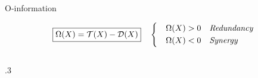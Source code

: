 \documentclass{beamer}
\renewcommand{\cite}[1]{\footnote<.->[frame]{\fullcite{#1}}}
\begin{document}



\begin{frame}{O-information}

\begin{equation*}
\fcolorbox{black}{white}{$  \Omega(X)=\cT(X)-\cD(X)$} \quad
  \begin{dcases*}
 \quad \Omega(X)> 0 &\textit{Redundancy}
  \\
 \quad \Omega(X)< 0 & \textit{Synergy}
\end{dcases*}
\end{equation*}




\begin{columns}
\begin{column}{.3\textwidth}
\begin{figure}
    \centering
    
\end{figure}
\end{column}
\end{columns}





\end{frame}
\end{document}
